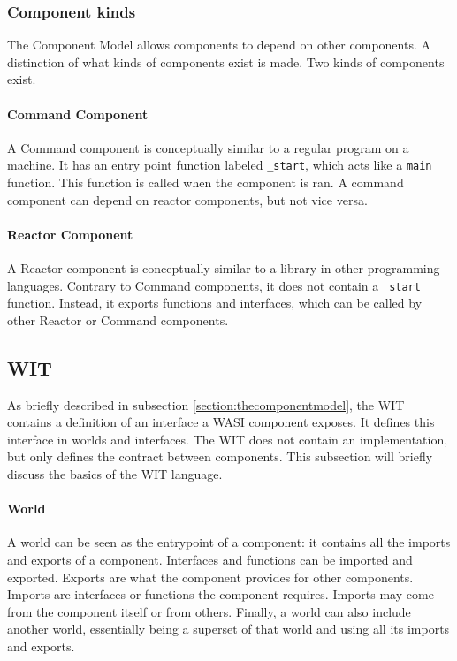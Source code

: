 \subsubsection{Component kinds}
\label{section:component_kinds}
The Component Model allows components to depend on other components. A distinction of what kinds of components exist is made. Two kinds of components exist.

\paragraph{Command Component}
A Command component is conceptually similar to a regular program on a machine. It has an entry point function labeled \texttt{\_start}, which acts like a \texttt{main} function. This function is called when the component is ran. A command component can depend on reactor components, but not vice versa.

\paragraph{Reactor Component}
A Reactor component is conceptually similar to a library in other programming languages. Contrary to Command components, it does not contain a \texttt{\_start} function. Instead, it exports functions and interfaces, which can be called by other Reactor or Command components.


\subsection{\acrfull{WIT}}
\label{section:WIT}

As briefly described in subsection \ref{section:thecomponentmodel}, the \acrfull{WIT} contains a definition of an interface a \acrshort{WASI} component exposes. It defines this interface in worlds and interfaces. The \acrshort{WIT} does not contain an implementation, but only defines the contract between components. This subsection will briefly discuss the basics of the \acrshort{WIT} language.

\paragraph{World}
A world can be seen as the entrypoint of a component: it contains all the imports and exports of a component. Interfaces and functions can be imported and exported. Exports are what the component provides for other components. Imports are interfaces or functions the component requires. Imports may come from the component itself or from others. Finally, a world can also include another world, essentially being a superset of that world and using all its imports and exports.

